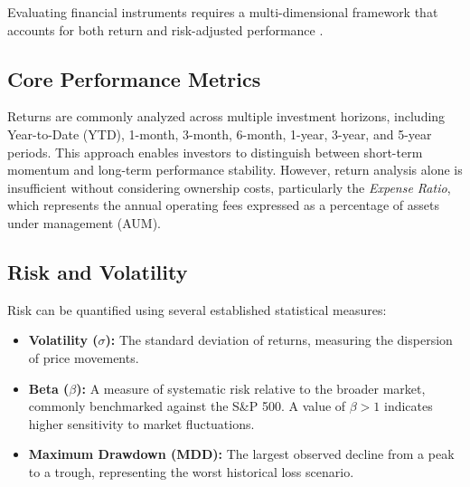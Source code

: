 Evaluating financial instruments requires a multi-dimensional framework that accounts for both return and risk-adjusted performance \cite{segal2025}.

\subsection{Core Performance Metrics}

Returns are commonly analyzed across multiple investment horizons, including Year-to-Date (YTD), 1-month, 3-month, 6-month, 1-year, 3-year, and 5-year periods. This approach enables investors to distinguish between short-term momentum and long-term performance stability. However, return analysis alone is insufficient without considering ownership costs, particularly the \textit{Expense Ratio}, which represents the annual operating fees expressed as a percentage of assets under management (AUM).

\subsection{Risk and Volatility}

Risk can be quantified using several established statistical measures:

\begin{itemize}
    \item \textbf{Volatility ($\sigma$):} The standard deviation of returns, measuring the dispersion of price movements.
    \item \textbf{Beta ($\beta$):} A measure of systematic risk relative to the broader market, commonly benchmarked against the S\&P 500. A value of $\beta > 1$ indicates higher sensitivity to market fluctuations.
    \item \textbf{Maximum Drawdown (MDD):} The largest observed decline from a peak to a trough, representing the worst historical loss scenario.
\end{itemize}

